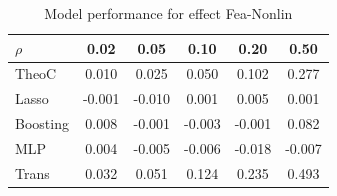\documentclass{article}
\begin{document}
\begin{table}[t]\label{table_nonlin}
    \centering
    \begin{tabular}{lccccc}
\toprule
$\rho$ & 0.02 & 0.05 & 0.10 & 0.20 & 0.50 \\
\midrule
TheoC & {\cellcolor[HTML]{AAC7FD}} \color[HTML]{000000} 0.010 & {\cellcolor[HTML]{EDD1C2}} \color[HTML]{000000} 0.025 & {\cellcolor[HTML]{CAD8EF}} \color[HTML]{000000} 0.050 & {\cellcolor[HTML]{D6DCE4}} \color[HTML]{000000} 0.102 & {\cellcolor[HTML]{EDD2C3}} \color[HTML]{000000} 0.277 \\
Lasso & {\cellcolor[HTML]{3B4CC0}} \color[HTML]{F1F1F1} -0.001 & {\cellcolor[HTML]{3B4CC0}} \color[HTML]{F1F1F1} -0.010 & {\cellcolor[HTML]{4A63D3}} \color[HTML]{F1F1F1} 0.001 & {\cellcolor[HTML]{5673E0}} \color[HTML]{F1F1F1} 0.005 & {\cellcolor[HTML]{3F53C6}} \color[HTML]{F1F1F1} 0.001 \\
Boosting & {\cellcolor[HTML]{94B6FF}} \color[HTML]{000000} 0.008 & {\cellcolor[HTML]{688AEF}} \color[HTML]{F1F1F1} -0.001 & {\cellcolor[HTML]{4055C8}} \color[HTML]{F1F1F1} -0.003 & {\cellcolor[HTML]{4F69D9}} \color[HTML]{F1F1F1} -0.001 & {\cellcolor[HTML]{7396F5}} \color[HTML]{F1F1F1} 0.082 \\
MLP & {\cellcolor[HTML]{6A8BEF}} \color[HTML]{F1F1F1} 0.004 & {\cellcolor[HTML]{536EDD}} \color[HTML]{F1F1F1} -0.005 & {\cellcolor[HTML]{3B4CC0}} \color[HTML]{F1F1F1} -0.006 & {\cellcolor[HTML]{3B4CC0}} \color[HTML]{F1F1F1} -0.018 & {\cellcolor[HTML]{3B4CC0}} \color[HTML]{F1F1F1} -0.007 \\
Trans & {\cellcolor[HTML]{B40426}} \color[HTML]{F1F1F1} 0.032 & {\cellcolor[HTML]{B40426}} \color[HTML]{F1F1F1} 0.051 & {\cellcolor[HTML]{B40426}} \color[HTML]{F1F1F1} 0.124 & {\cellcolor[HTML]{B40426}} \color[HTML]{F1F1F1} 0.235 & {\cellcolor[HTML]{B40426}} \color[HTML]{F1F1F1} 0.493 \\
\bottomrule
\end{tabular}
\vskip 0.05in
\caption{Model performance for effect Fea-Nonlin}
    \label{table_nonlin}
    \end{table}
\end{document}
